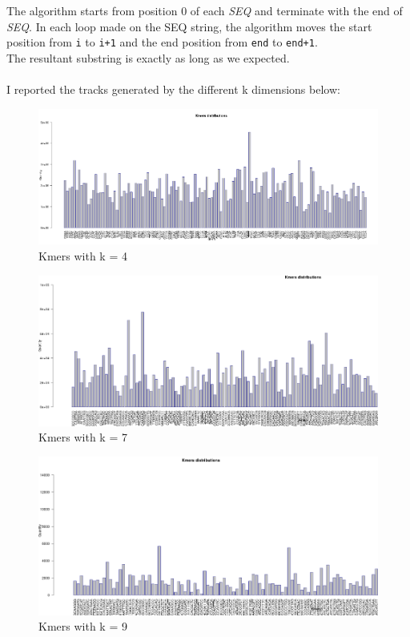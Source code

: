 The algorithm starts from position 0 of each \emph{SEQ} and terminate with the end of \emph{SEQ}.
In each loop made on the SEQ string, the algorithm moves the start position from \verb|i| to \verb|i+1| and the end position from \verb|end| to \verb|end+1|.\\
The resultant substring is exactly as long as we expected.\\\\

I reported the tracks generated by the different k dimensions below:

 \begin{figure}[H]
				\centering
				\includegraphics[scale=0.45]{immagini/kmers_4.png}
				\caption{Kmers with k = 4}\label{fig:12}
				\end{figure}


 \begin{figure}[H]
				\centering
				\includegraphics[scale=0.45]{immagini/kmers_7.png}
				\caption{Kmers with k = 7}\label{fig:13}
				\end{figure}
				
				
				
 \begin{figure}[H]
				\centering
				\includegraphics[scale=0.45]{immagini/kmers_9.png}
				\caption{Kmers with k = 9}\label{fig:14}
				\end{figure}	
				
